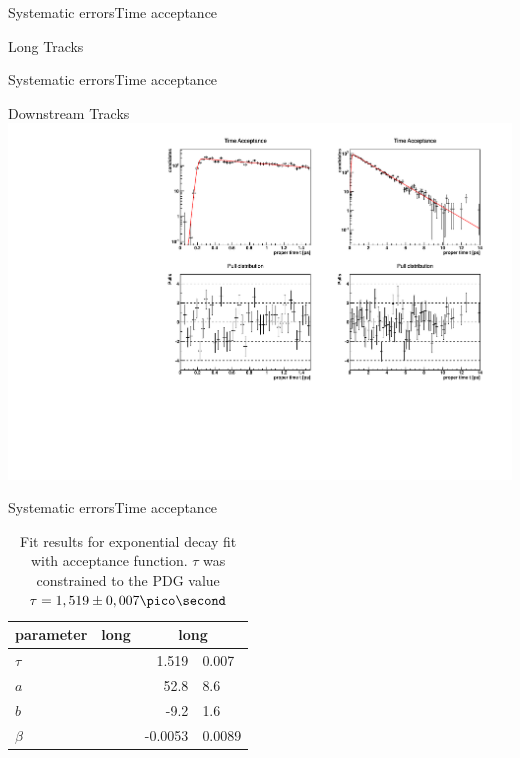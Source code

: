 \documentclass{beamer}
\begin{document}
\begin{frame}{Systematic errors}{Time acceptance}
\begin{block}{Long Tracks}
\end{block}
\end{frame}

\begin{frame}{Systematic errors}{Time acceptance}
\begin{block}{Downstream Tracks}
\includegraphics[width=\textwidth]{time_acceptance_fit_ds}
\end{block}
\end{frame}

\begin{frame}{Systematic errors}{Time acceptance}
\begin{table}
\caption{Fit results for exponential decay fit with acceptance function. $\tau$ was constrained to the PDG value $\tau = 1,519 \pm 0,007 \pico\second$}
\begin{tabular}{lr@{$\pm$}l r@{$\pm$}l}
\hline \hline 
parameter & \multicolumn{2}{c}{long} & \multicolumn{2}{c}{long} \\ \hline
$\tau$    & & &  1.519   & 0.007 \\
$a$       & & &  52.8    & 8.6 \\
$b$       & & &  -9.2    & 1.6 \\
$\beta$   & & &  -0.0053 & 0.0089 \\ 
\hline \hline
\end{tabular}
\end{table}
\end{frame}
\end{document}

